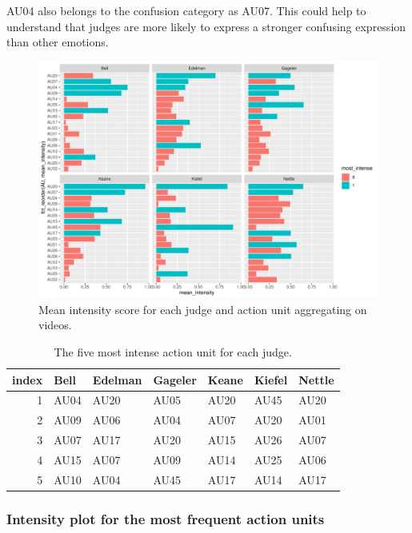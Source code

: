\documentclass{monashthesis}
\begin{document}
AU04 also belongs to the confusion category as AU07. This could help to understand that judges are more likely to express a stronger confusing expression than other emotions.

\begin{figure}

{\centering \includegraphics[width=1\linewidth]{figures/mean-intensity-1} 

}

\caption{Mean intensity score for each judge and action unit aggregating on videos.\label{fig:mean_intensity}}\label{fig:mean-intensity}
\end{figure}

\begin{table}

\caption{\label{tab:intensity-table}\label{tab:most_intense}The five most intense action unit for each judge.}
\centering
\begin{tabular}[t]{r|l|l|l|l|l|l}
\hline
index & Bell & Edelman & Gageler & Keane & Kiefel & Nettle\\
\hline
1 & AU04 & AU20 & AU05 & AU20 & AU45 & AU20\\
\hline
2 & AU09 & AU06 & AU04 & AU07 & AU20 & AU01\\
\hline
3 & AU07 & AU17 & AU20 & AU15 & AU26 & AU07\\
\hline
4 & AU15 & AU07 & AU09 & AU14 & AU25 & AU06\\
\hline
5 & AU10 & AU04 & AU45 & AU17 & AU14 & AU17\\
\hline
\end{tabular}
\end{table}

\hypertarget{intensity-plot-for-the-most-frequent-action-units}{%
\subsubsection{Intensity plot for the most frequent action units}\label{intensity-plot-for-the-most-frequent-action-units}}
\end{document}
